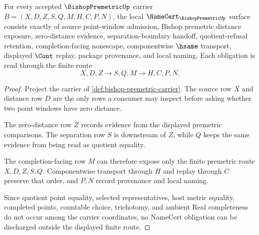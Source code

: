 \begin{theorem}
\label{thm:bishop-premetric-namecert-obligations}
For every accepted $\BishopPremetricUp$ carrier $B=(X,D,Z,S,Q,M,H,C,P,N)$, the local $\NameCert_{\BishopPremetricUp}$ surface consists exactly of source point-window admission, Bishop premetric distance exposure, zero-distance evidence, separation-boundary handoff, quotient-refusal retention, completion-facing nonescape, componentwise $\hsame$ transport, displayed $\Cont$ replay, package provenance, and local naming. Each obligation is read through the finite route
$$
X,D,Z \longrightarrow S,Q,M \longrightarrow H,C,P,N .
$$
\end{theorem}
\begin{proof}
Project the carrier of \autoref{def:bishop-premetric-carrier}. The source row $X$ and distance row $D$ are the only rows a consumer may inspect before asking whether two point windows have zero distance.

The zero-distance row $Z$ records evidence from the displayed premetric comparisons. The separation row $S$ is downstream of $Z$, while $Q$ keeps the same evidence from being read as quotient equality.

The completion-facing row $M$ can therefore expose only the finite premetric route $X,D,Z,S,Q$. Componentwise transport through $H$ and replay through $C$ preserve that order, and $P,N$ record provenance and local naming.

Since quotient point equality, selected representatives, host metric equality, completed points, countable choice, trichotomy, and ambient Real completeness do not occur among the carrier coordinates, no NameCert obligation can be discharged outside the displayed finite route.
\end{proof}

